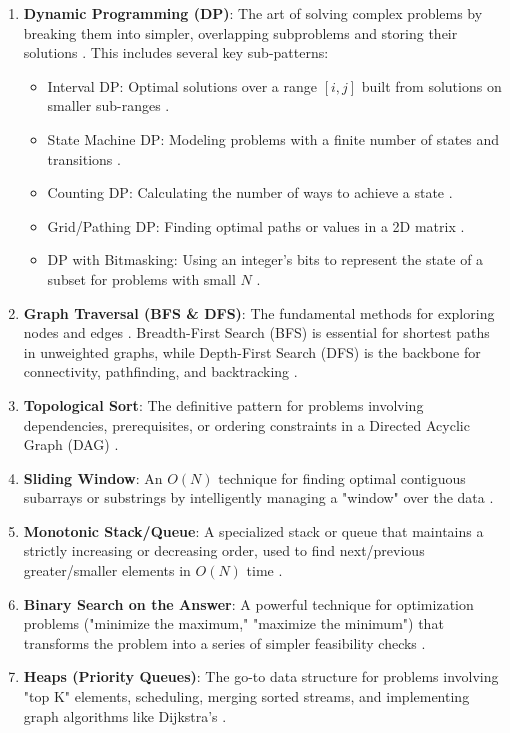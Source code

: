 \documentclass{article}
\begin{document}
\begin{enumerate}
\item \textbf{Dynamic Programming (DP)}: The art of solving complex problems by breaking them into simpler, overlapping subproblems and storing their solutions \cite{9}. This includes several key sub-patterns:
\begin{itemize}
\item Interval DP: Optimal solutions over a range $[i, j]$ built from solutions on smaller sub-ranges \cite{12}.
\item State Machine DP: Modeling problems with a finite number of states and transitions \cite{13}.
\item Counting DP: Calculating the number of ways to achieve a state \cite{14}.
\item Grid/Pathing DP: Finding optimal paths or values in a 2D matrix \cite{15}.
\item DP with Bitmasking: Using an integer's bits to represent the state of a subset for problems with small $N$ \cite{17}.
\end{itemize}
\item \textbf{Graph Traversal (BFS \& DFS)}: The fundamental methods for exploring nodes and edges \cite{18}. Breadth-First Search (BFS) is essential for shortest paths in unweighted graphs, while Depth-First Search (DFS) is the backbone for connectivity, pathfinding, and backtracking \cite{19}.
\item \textbf{Topological Sort}: The definitive pattern for problems involving dependencies, prerequisites, or ordering constraints in a Directed Acyclic Graph (DAG) \cite{20}.
\item \textbf{Sliding Window}: An $O(N)$ technique for finding optimal contiguous subarrays or substrings by intelligently managing a "window" over the data \cite{21}.
\item \textbf{Monotonic Stack/Queue}: A specialized stack or queue that maintains a strictly increasing or decreasing order, used to find next/previous greater/smaller elements in $O(N)$ time \cite{22}.
\item \textbf{Binary Search on the Answer}: A powerful technique for optimization problems ("minimize the maximum," "maximize the minimum") that transforms the problem into a series of simpler feasibility checks \cite{23}.
\item \textbf{Heaps (Priority Queues)}: The go-to data structure for problems involving "top K" elements, scheduling, merging sorted streams, and implementing graph algorithms like Dijkstra's \cite{24}.

\end{enumerate}
\end{document}
